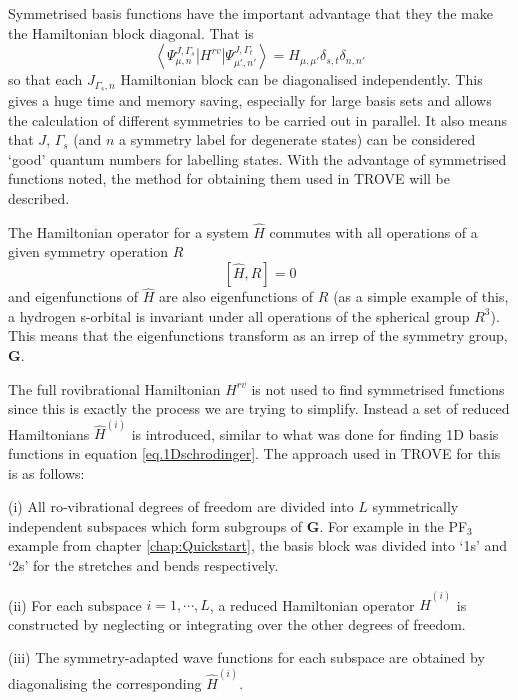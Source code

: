 Symmetrised basis functions have the important advantage that they the make the Hamiltonian block diagonal. That is
\begin{equation}
\label{eq.Ham_block_diag}
\left< \Psi_{\mu,n}^{J,\Gamma_s} | H^{rv} | \Psi_{\mu',n'}^{J,\Gamma_t} \right>  = H_{\mu,\mu'} \delta_{s,t}\delta_{n,n'}
\end{equation}
so that each $J_{\Gamma_s,n}$ Hamiltonian block can be diagonalised independently. This gives a huge time and memory
saving, especially for large basis sets and allows the calculation of different symmetries to be carried out in
parallel. It also means that $J$, $\Gamma_s$ (and $n$ a symmetry label for degenerate states) 
can be considered `good' quantum numbers for labelling states. 
With the advantage of symmetrised functions noted, the method for obtaining them used in TROVE will be described.

The Hamiltonian operator for a system $\hat{H}$ commutes with all operations of a given symmetry operation $R$
\begin{equation}
\label{eq.Ham_commute}
\left[\hat{H},R\right] = 0
\end{equation}
and eigenfunctions of $\hat{H}$ are also eigenfunctions of $R$ (as a simple example of this, a hydrogen s-orbital is invariant
under all operations of the spherical group $R^3$). This means that the eigenfunctions transform as an 
irrep of the symmetry group, $\mathbf{G}$. 

The full rovibrational Hamiltonian $H^{rv}$ is not used to find symmetrised functions since this is exactly the process we
are trying to simplify. Instead a set of reduced Hamiltonians $\hat{H}^{(i)}$ is introduced, similar to what was done 
for finding 1D basis functions in equation \ref{eq.1Dschrodinger}. The approach used in TROVE for this is as follows:

(i) All ro-vibrational degrees of freedom are divided into $L$ symmetrically independent subspaces which form subgroups of 
$\mathbf{G}$. For example in the PF$_3$ example from chapter \ref{chap:Quickstart}, the basis block was divided into `1s' 
and `2s' for the stretches and bends respectively.

(ii) For each subspace $i = 1, \cdots, L$, a reduced Hamiltonian operator $\hat{H}^{(i)}$ is constructed by neglecting 
or integrating over the other degrees of freedom.

(iii) The symmetry-adapted wave functions for each subspace are obtained by diagonalising the corresponding $\hat{H}^{(i)}$.

